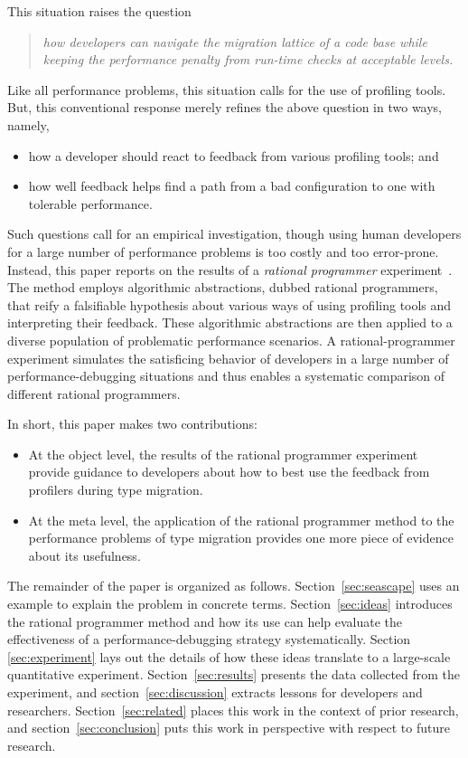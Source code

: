 This situation raises the question 
\begin{quote} \em
 how developers can navigate the migration lattice of a code base while keeping
 the performance penalty from run-time checks at acceptable levels.
\end{quote}  
Like all performance problems, this situation calls for the use of profiling
tools. But, this conventional response merely refines the above question in two
ways, namely,
\begin{itemize} \em

\item how a developer should react to feedback from various profiling tools; and 

\item how well feedback helps find a path from a bad configuration to one with
 tolerable performance.

\end{itemize}   

Such questions call for an empirical investigation, though using human
developers for a large number of performance problems is too costly and too
error-prone. Instead, this paper reports on the results of a \emph{rational
programmer} experiment~\cite{lgfd-icfp-2021}. The method employs algorithmic
abstractions, dubbed rational programmers, that reify a falsifiable hypothesis
about various ways of using profiling tools and interpreting their feedback.
These algorithmic abstractions are then applied to a diverse population of
problematic performance scenarios. A rational-programmer experiment simulates the
satisficing behavior of developers in a large number of performance-debugging
situations and thus enables a systematic comparison of different rational
programmers.

In short, this paper makes two contributions:
\begin{itemize}

\item At the object level, the results of the rational programmer experiment
 provide guidance to developers about how to best use the feedback from
 profilers during type migration.

\item At the meta level, the application of the rational programmer method to
 the performance problems of type migration provides one more piece of evidence
 about its usefulness. 
    
\end{itemize}    
The remainder of the paper is organized as follows.  Section~\ref{sec:seascape}
uses an example to explain the problem in concrete terms. Section~\ref{sec:ideas}
introduces the rational programmer method and how its use can help evaluate the
effectiveness of a performance-debugging strategy systematically. Section
\ref{sec:experiment} lays out the details of how these ideas translate to a
large-scale quantitative experiment.  Section~\ref{sec:results} presents the data
collected from the experiment, and section~\ref{sec:discussion} extracts lessons
for developers and researchers.  Section~\ref{sec:related} places this work in
the context of prior research, and section~\ref{sec:conclusion} puts this work in
perspective with respect to future research.
